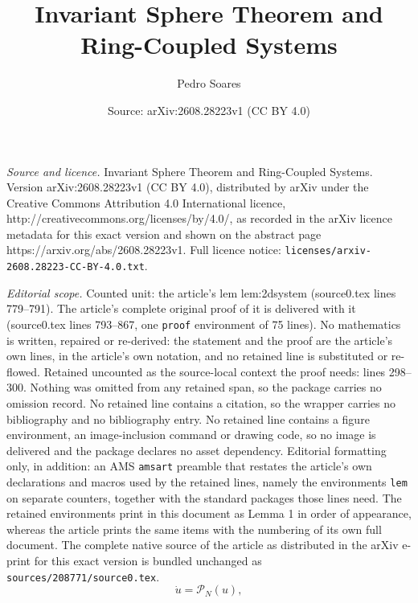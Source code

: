 \documentclass[10pt,a4paper]{amsart}
\title{Invariant Sphere Theorem and Ring-Coupled Systems}
\author{Pedro Soares}
\date{Source: arXiv:2608.28223v1 (CC BY 4.0)}
\begin{document}
\maketitle

\noindent\emph{Source and licence.} Invariant Sphere Theorem and Ring-Coupled Systems. Version arXiv:2608.28223v1 (CC BY 4.0), distributed by arXiv under the Creative Commons Attribution 4.0 International licence, http://creativecommons.org/licenses/by/4.0/, as recorded in the arXiv licence metadata for this exact version and shown on the abstract page https://arxiv.org/abs/2608.28223v1. Full licence notice: \texttt{licenses/arxiv-2608.28223-CC-BY-4.0.txt}.\par\smallskip

\noindent\textit{Editorial scope.} Counted unit: the article's lem lem:2dsystem (source0.tex lines 779--791). The article's complete original proof of it is delivered with it (source0.tex lines 793--867, one \texttt{proof} environment of 75 lines). No mathematics is written, repaired or re-derived: the statement and the proof are the article's own lines, in the article's own notation, and no retained line is substituted or re-flowed.  Retained uncounted as the source-local context the proof needs: lines 298--300.  Nothing was omitted from any retained span, so the package carries no omission record.  No retained line contains a citation, so the wrapper carries no bibliography and no bibliography entry.  No retained line contains a figure environment, an image-inclusion command or drawing code, so no image is delivered and the package declares no asset dependency.  Editorial formatting only, in addition: an AMS \texttt{amsart} preamble that restates the article's own declarations and macros used by the retained lines, namely the environments \texttt{lem} on separate counters, together with the standard packages those lines need.  The retained environments print in this document as Lemma 1 in order of appearance, whereas the article prints the same items with the numbering of its own full document.  The complete native source of the article as distributed in the arXiv e-print for this exact version is bundled unchanged as \texttt{sources/208771/source0.tex}.
\begin{equation}\label{eq:edosphere} 
\dot{u}=\mathcal{P}_N(u),
\end{equation}
\end{document}
